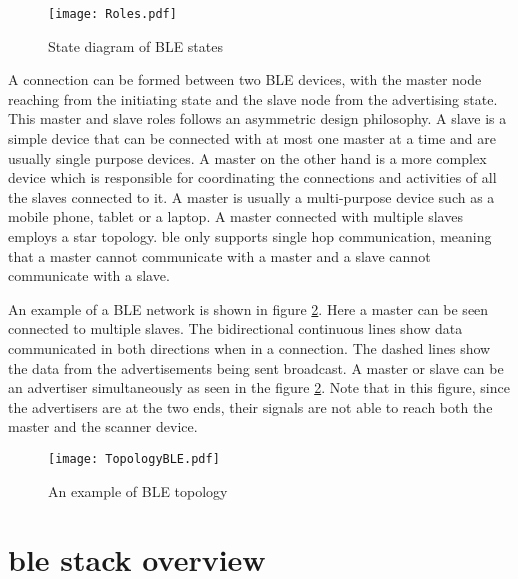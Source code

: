 \begin{figure}[t] %
\centering
\vspace{-15pt}
\texttt{[image: Roles.pdf]}
\vspace{-5pt}
\caption{State diagram of BLE states  \cite{BLE101}}
\label{fig:Roles}
\vspace{-10pt}
\end{figure}

A connection can be formed between two BLE devices, with the master node reaching from the initiating state and the slave node from the advertising state. This master and slave roles follows an asymmetric design philosophy. A slave is a simple device that can be connected with at most one master at a time and are usually single purpose devices. A master on the other hand is a more complex device which is responsible for coordinating the connections and activities of all the slaves connected to it. A master is usually a multi-purpose device such as a mobile phone, tablet or a laptop. A master connected with multiple slaves employs a star topology. \gls{ble} only supports single hop communication, meaning that a master cannot communicate with a master and a slave cannot communicate with a slave.

An example of a BLE network is shown in figure \ref{fig:TopoBLE}. Here a master can be seen connected to multiple slaves. The bidirectional continuous lines show data communicated in both directions when in a connection. The dashed lines show the data from the advertisements being sent broadcast. A master or slave can be an advertiser simultaneously as seen in the figure \ref{fig:TopoBLE}. Note that in this figure, since the advertisers are at the two ends, their signals are not able to reach both the master and the scanner device.

\begin{figure}[h]
\centering
\texttt{[image: TopologyBLE.pdf]}
\caption{An example of BLE topology  \cite{BLE101}}
\label{fig:TopoBLE}
\vspace{-10pt}
\end{figure}

\section[\texorpdfstring{\gls{ble}}{BLE} Stack Overview]{\texorpdfstring{\gls{ble}}{BLE} stack overview \cite{Heydon2012}}

